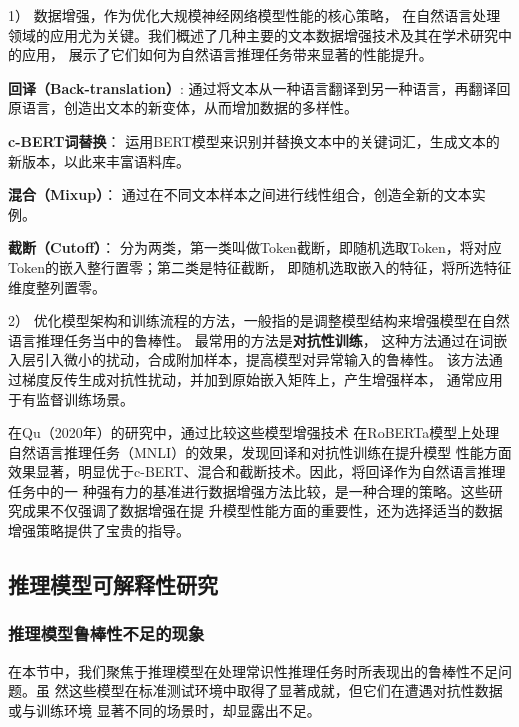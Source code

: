 1） 数据增强，作为优化大规模神经网络模型性能的核心策略，
在自然语言处理领域的应用尤为关键。我们概述了几种主要的文本数据增强技术及其在学术研究中的应用，
展示了它们如何为自然语言推理任务带来显著的性能提升。

\textbf{回译（Back-translation）}\cite{sennrich2016improving,edunov2018understanding,xie2020unsupervised}:
通过将文本从一种语言翻译到另一种语言，再翻译回原语言，创造出文本的新变体，从而增加数据的多样性。

\textbf{c-BERT词替换}\cite{wu2019conditional}：
运用BERT模型来识别并替换文本中的关键词汇，生成文本的新版本，以此来丰富语料库。

\textbf{混合（Mixup）}\cite{guo2019augmenting,chen2020mixtext}：
通过在不同文本样本之间进行线性组合，创造全新的文本实例。

\textbf{截断（Cutoff）}\cite{shen2020simple}：
分为两类，第一类叫做Token截断，即随机选取Token，将对应Token的嵌入整行置零；第二类是特征截断，
即随机选取嵌入的特征，将所选特征维度整列置零。

2） 优化模型架构和训练流程的方法，一般指的是调整模型结构来增强模型在自然语言推理任务当中的鲁棒性。
最常用的方法是\textbf{对抗性训练}\cite{zhu2019freelb,jiang2020smart}，
这种方法通过在词嵌入层引入微小的扰动，合成附加样本，提高模型对异常输入的鲁棒性。
该方法通过梯度反传生成对抗性扰动，并加到原始嵌入矩阵上，产生增强样本，
通常应用于有监督训练场景。

在Qu（2020年）\cite{qu2020coda}的研究中，通过比较这些模型增强技术
在RoBERTa模型上处理自然语言推理任务（MNLI）的效果，发现回译和对抗性训练在提升模型
性能方面效果显著，明显优于c-BERT、混合和截断技术。因此，将回译作为自然语言推理任务中的一
种强有力的基准进行数据增强方法比较，是一种合理的策略。这些研究成果不仅强调了数据增强在提
升模型性能方面的重要性，还为选择适当的数据增强策略提供了宝贵的指导。

\subsection{推理模型可解释性研究}
\label{sec1:interpretability}

\subsubsection{推理模型鲁棒性不足的现象}

在本节中，我们聚焦于推理模型在处理常识性推理任务时所表现出的鲁棒性不足问题。虽
然这些模型在标准测试环境中取得了显著成就，但它们在遭遇对抗性数据或与训练环境
显著不同的场景时，却显露出不足\cite{naik2018stress,mccoy2019right,schuster2019towards,nie2020adversarial,Marco2020acl}。

